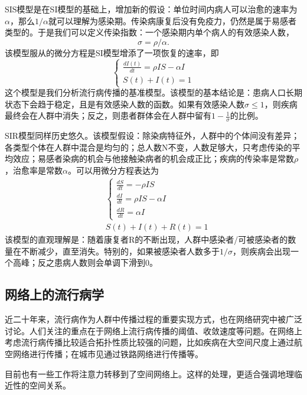 SIS模型是在SI模型的基础上，增加新的假设：单位时间内病人可以治愈的速率为$\alpha$，那么$1/\alpha$就可以理解为感染期。传染病康复后没有免疫力，仍然是属于易感者类型的。于是我们可以定义传染指数：一个感染期内单个病人的有效感染人数，\[\sigma = \rho/\alpha.\]该模型服从的微分方程是SI模型增添了一项恢复的速率，即\begin{equation}
    \left\{\begin{array}{l}
    {\frac{d I(t)}{d t}=\rho I S-\alpha I} \\
    {S(t)+I(t)=1}
    \end{array}\right.
    \end{equation}
这个模型是我们分析流行病传播的基准模型。该模型的基本结论是：患病人口长期状态下会趋于稳定，且是有效感染人数的函数。如果有效感染人数$\sigma\le 1$，则疾病最终会在人群中消失；反之，则患者群体会在人群中留有$1-\frac{1}{\sigma}$的比例。

SIR模型同样历史悠久\cite{kermack1927contribution}。该模型假设：除染病特征外，人群中的个体间没有差异；各类型个体在人群中混合是均匀的；总人数N不变，人数足够大，只考虑传染的平均效应；易感者染病的机会与他接触染病者的机会成正比；疾病的传染率是常数$\rho$，治愈率是常数$\alpha$。可以用微分方程表达为
\begin{equation}
    \begin{aligned}
    &\left\{\begin{array}{l}
    {\frac{d S}{d t}=-\rho I S} \\
    {\frac{d I}{d t}=\rho I S-\alpha I} \\
    {\frac{d R}{d t}=\alpha I}
    \end{array}\right.\\
    &S(t)+I(t)+R(t)=1
    \end{aligned}
\end{equation}
该模型的直观理解是：随着康复者R的不断出现，人群中感染者/可被感染者的数量在不断减少，直至消失。特别的，如果被感染者人数多于$1/\sigma$，则疾病会出现一个高峰；反之患病人数则会单调下滑到$0$。

\subsection{网络上的流行病学}

近二十年来，流行病作为人群中传播过程的重要实现方式，也在网络研究中被广泛讨论。人们关注的重点在于网络上流行病传播的阈值、收敛速度等问题。在网络上考虑流行病传播比较适合拓扑性质比较强的问题，比如疾病在大空间尺度上通过航空网络进行传播；在城市见通过铁路网络进行传播等。

目前也有一些工作将注意力转移到了空间网络上。这样的处理，更适合强调地理临近性的空间关系。

